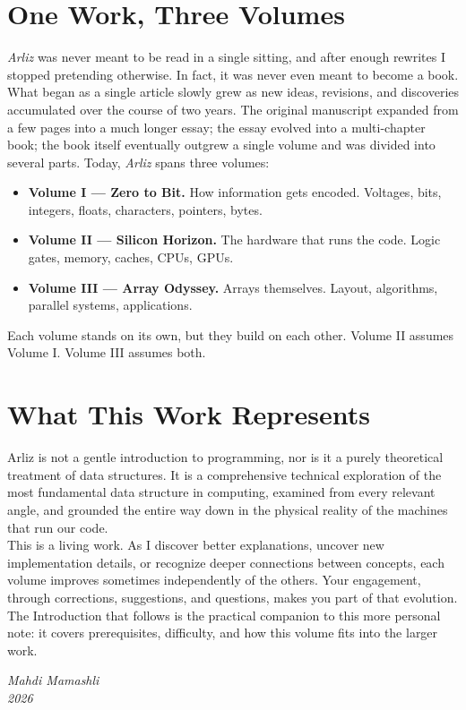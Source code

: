\vfill
{\small \linespread{1.2}\selectfont
\section*{One Work, Three Volumes}
\textit{Arliz} was never meant to be read in a single sitting, and after enough rewrites I stopped pretending otherwise. In fact, it was never even meant to become a book.\\
What began as a single article slowly grew as new ideas, revisions, and discoveries accumulated over the course of two years. The original manuscript expanded from a few pages into a much longer essay; the essay evolved into a multi-chapter book; the book itself eventually outgrew a single volume and was divided into several parts. Today, \textit{Arliz} spans three volumes:

\begin{itemize}
    \item \textbf{Volume I --- Zero to Bit.} How information gets encoded. Voltages, bits, integers, floats, characters, pointers, bytes.
    \item \textbf{Volume II --- Silicon Horizon.} The hardware that runs the code. Logic gates, memory, caches, CPUs, GPUs.
    \item \textbf{Volume III --- Array Odyssey.} Arrays themselves. Layout, algorithms, parallel systems, applications.
\end{itemize}
Each volume stands on its own, but they build on each other. Volume II assumes Volume I. Volume III assumes both.

\section*{What This Work Represents}
Arliz is not a gentle introduction to programming, nor is it a purely theoretical treatment of data structures. It is a comprehensive technical exploration of the most fundamental data structure in computing, examined from every relevant angle, and grounded the entire way down in the physical reality of the machines that run our code.\\
This is a living work. As I discover better explanations, uncover new implementation details, or recognize deeper connections between concepts, each volume improves sometimes independently of the others. Your engagement, through corrections, suggestions, and questions, makes you part of that evolution. The Introduction that follows is the practical companion to this more personal note: it covers prerequisites, difficulty, and how this volume fits into the larger work.

\vfill

\begin{flushright}
    \textit{Mahdi Mamashli} \\
    \textit{2026}
\end{flushright}
}
\clearpage